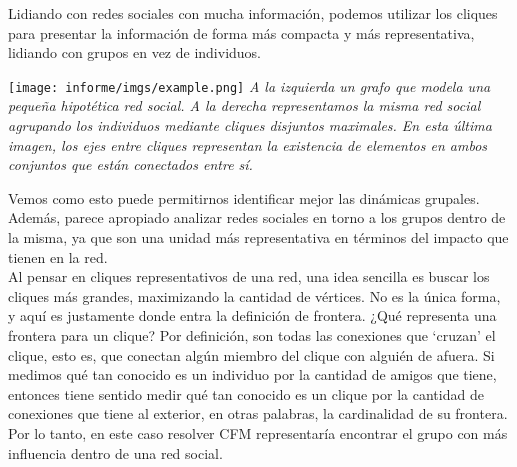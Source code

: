 Lidiando con redes sociales con mucha información, podemos utilizar los cliques para presentar la información de forma más compacta y más representativa, lidiando con grupos en vez de individuos. \\

\vspace{-1cm}
\begin{center}
	\texttt{[image: informe/imgs/example.png]}
	\textit{A la izquierda un grafo que modela una pequeña hipotética red social. A la derecha representamos la misma red social agrupando los individuos mediante cliques disjuntos maximales. En esta última imagen, los ejes entre cliques representan la existencia de elementos en ambos conjuntos que están conectados entre sí.}
\end{center}

Vemos como esto puede permitirnos identificar mejor las dinámicas grupales. Además, parece apropiado analizar redes sociales en torno a los grupos dentro de la misma, ya que son una unidad más representativa en términos del impacto que tienen en la red. \\

Al pensar en cliques representativos de una red, una idea sencilla es buscar los cliques más grandes, maximizando la cantidad de vértices. No es la única forma, y aquí es justamente donde entra la definición de frontera. ¿Qué representa una frontera para un clique? Por definición, son todas las conexiones que `cruzan' el clique, esto es, que conectan algún miembro del clique con alguién de afuera. Si medimos qué tan conocido es un individuo por la cantidad de amigos que tiene, entonces tiene sentido medir qué tan conocido es un clique por la cantidad de conexiones que tiene al exterior, en otras palabras, la cardinalidad de su frontera. Por lo tanto, en este caso resolver CFM representaría encontrar el grupo con más influencia dentro de una red social. \\